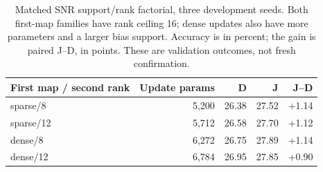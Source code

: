 \begin{table}[t]
\centering
\caption{Matched SNR support/rank factorial, three development seeds. Both first-map families have rank ceiling 16; dense updates also have more parameters and a larger bias support. Accuracy is in percent; the gain is paired J--D, in points. These are validation outcomes, not fresh confirmation.}
\label{tab:support_factorial}
\begin{tabular}{lrrrr}
\toprule
First map / second rank & Update params & D & J & J--D \\
\midrule
sparse/8 & 5,200 & 26.38 & 27.52 & +1.14 \\
sparse/12 & 5,712 & 26.58 & 27.70 & +1.12 \\
dense/8 & 6,272 & 26.75 & 27.89 & +1.14 \\
dense/12 & 6,784 & 26.95 & 27.85 & +0.90 \\
\bottomrule
\end{tabular}
\end{table}
